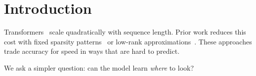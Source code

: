 \section{Introduction}
Transformers~\citep{vaswani2017attention} scale quadratically with sequence
length. Prior work reduces this cost with fixed sparsity patterns~\citep{child2019sparse}
or low-rank approximations~\citep{wang2020linformer}. These approaches trade
accuracy for speed in ways that are hard to predict.

We ask a simpler question: can the model learn \emph{where} to look?
